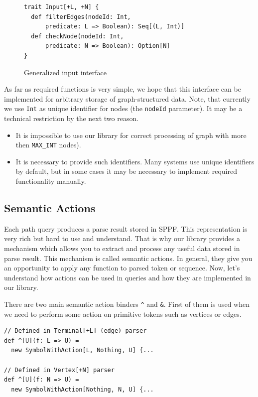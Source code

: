 \begin{figure}[h]
\begin{lstlisting}
trait Input[+L, +N] {
  def filterEdges(nodeId: Int, 
      predicate: L => Boolean): Seq[(L, Int)]
  def checkNode(nodeId: Int, 
      predicate: N => Boolean): Option[N]
}

\end{lstlisting}
\caption{Generalized input interface}
\label{fig:input}
\end{figure}

As far as required functions is very simple, we hope that this interface can be implemented for arbitrary storage of graph-structured data.
Note, that currently we use \lstinline{Int} as unique identifier for nodes (the \lstinline{nodeId} parameter).
It may be a technical restriction by the next two reason.
\begin{itemize}
\item It is impossible to use our library for correct processing of graph with more then \lstinline{MAX_INT} nodes). 
\item It is necessary to provide such identifiers. Many systems use unique identifiers by default, but in some cases it may be necessary to implement required functionality manually.
\end{itemize}



\subsection{Semantic Actions}
\label{sec:semanticActions}
Each path query produces a parse result stored in SPPF.
This representation is very rich but hard to use and understand.
That is why our library provides a mechanism which allows you to extract and process any useful data stored in parse result.
This mechanism is called semantic actions.
In general, they give you an opportunity to apply any function to parsed token or sequence.
Now, let's understand how actions can be used in queries and how they are implemented in our library.

There are two main semantic action binders \lstinline{^} and \lstinline{&}.
First of them is used when we need to perform some action on primitive tokens such as vertices or edges.
\begin{lstlisting}
// Defined in Terminal[+L] (edge) parser
def ^[U](f: L => U) = 
  new SymbolWithAction[L, Nothing, U] {...
  
// Defined in Vertex[+N] parser
def ^[U](f: N => U) = 
  new SymbolWithAction[Nothing, N, U] {...
\end{lstlisting}

